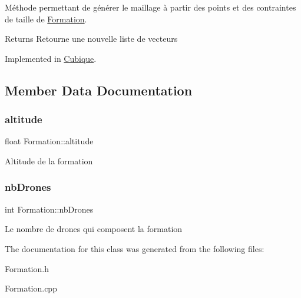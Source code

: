 Méthode permettant de générer le maillage à partir des points et des contraintes de taille de \mbox{\hyperlink{class_formation}{Formation}}. \begin{DoxyReturn}{Returns}
Retourne une nouvelle liste de vecteurs 
\end{DoxyReturn}


Implemented in \mbox{\hyperlink{class_cubique_a9a3988f05aa6bacdf2cc660fef17138e}{Cubique}}.



\subsection{Member Data Documentation}
\mbox{\label{class_formation_a46ac97ac7c664d265c91a9ba3c718282}} 
\subsubsection{\texorpdfstring{altitude}{altitude}}
{\footnotesize\ttfamily float Formation\+::altitude\hspace{0.3cm}{\ttfamily [protected]}}

Altitude de la formation \mbox{\label{class_formation_a946670f42a19f84960990e9ffb781877}} 
\subsubsection{\texorpdfstring{nb\+Drones}{nbDrones}}
{\footnotesize\ttfamily int Formation\+::nb\+Drones\hspace{0.3cm}{\ttfamily [protected]}}

Le nombre de drones qui composent la formation 

The documentation for this class was generated from the following files\+:\begin{DoxyCompactItemize}
\item 
Formation.\+h\item 
Formation.\+cpp\end{DoxyCompactItemize}
